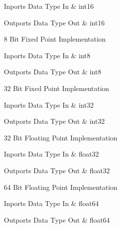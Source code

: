 \begin{XtoCtabular}{Inports Data Type}
In & int16\tabularnewline
\hline
\end{XtoCtabular}

\begin{XtoCtabular}{Outports Data Type}
Out & int16\tabularnewline
\hline
\end{XtoCtabular}

\ifdefined \AddTestReports
{}
\fi
{}
\nopagebreak[0]

8 Bit Fixed Point Implementation

\begin{XtoCtabular}{Inports Data Type}
In & int8\tabularnewline
\hline
\end{XtoCtabular}

\begin{XtoCtabular}{Outports Data Type}
Out & int8\tabularnewline
\hline
\end{XtoCtabular}

\ifdefined \AddTestReports
{}
\fi
{}
\nopagebreak[0]

32 Bit Fixed Point Implementation

\begin{XtoCtabular}{Inports Data Type}
In & int32\tabularnewline
\hline
\end{XtoCtabular}

\begin{XtoCtabular}{Outports Data Type}
Out & int32\tabularnewline
\hline
\end{XtoCtabular}

\ifdefined \AddTestReports
{}
\fi
{}
\nopagebreak[0]

32 Bit Floating Point Implementation

\begin{XtoCtabular}{Inports Data Type}
In & float32\tabularnewline
\hline
\end{XtoCtabular}

\begin{XtoCtabular}{Outports Data Type}
Out & float32\tabularnewline
\hline
\end{XtoCtabular}

\ifdefined \AddTestReports
{}
\fi
{}
\nopagebreak[0]

64 Bit Floating Point Implementation

\begin{XtoCtabular}{Inports Data Type}
In & float64\tabularnewline
\hline
\end{XtoCtabular}

\begin{XtoCtabular}{Outports Data Type}
Out & float64\tabularnewline
\hline
\end{XtoCtabular}

\ifdefined \AddTestReports
{}
\fi
